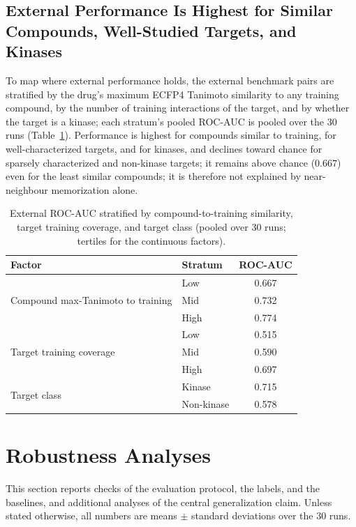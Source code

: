 \documentclass[11pt,letterpaper]{article}
\begin{document}
\subsection{External Performance Is Highest for Similar Compounds, Well-Studied Targets, and Kinases}
\label{sec:generalization}
To map where external performance holds, the external benchmark pairs are stratified by the drug's maximum ECFP4 Tanimoto similarity to any training compound, by the number of training interactions of the target, and by whether the target is a kinase; each stratum's pooled ROC-AUC is pooled over the 30 runs (Table~\ref{tab:generalization}). Performance is highest for compounds similar to training, for well-characterized targets, and for kinases, and declines toward chance for sparsely characterized and non-kinase targets; it remains above chance ($0.667$) even for the least similar compounds; it is therefore not explained by near-neighbour memorization alone.

\begin{table}[!t]
\centering
\caption{External ROC-AUC stratified by compound-to-training similarity, target training coverage, and target class (pooled over 30 runs; tertiles for the continuous factors).}
\label{tab:generalization}
\small
\begin{tabular}{llc}
\toprule
\textbf{Factor} & \textbf{Stratum} & \textbf{ROC-AUC} \\
\midrule
\multirow{3}{*}{Compound max-Tanimoto to training}
 & Low & 0.667 \\
 & Mid & 0.732 \\
 & High & 0.774 \\
\midrule
\multirow{3}{*}{Target training coverage}
 & Low & 0.515 \\
 & Mid & 0.590 \\
 & High & 0.697 \\
\midrule
\multirow{2}{*}{Target class}
 & Kinase & 0.715 \\
 & Non-kinase & 0.578 \\
\bottomrule
\end{tabular}
\end{table}

\FloatBarrier

\section{Robustness Analyses}
\label{sec:robustness}
This section reports checks of the evaluation protocol, the labels, and the baselines, and additional analyses of the central generalization claim. Unless stated otherwise, all numbers are means $\pm$ standard deviations over the 30 runs.
\end{document}

